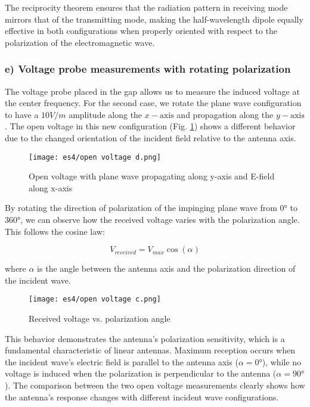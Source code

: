 \documentclass{article}
\begin{document}
The reciprocity theorem ensures that the radiation pattern in receiving mode mirrors that of the transmitting mode, making the half-wavelength dipole equally effective in both configurations when properly oriented with respect to the polarization of the electromagnetic wave.

\subsubsection{e) Voltage probe measurements with rotating polarization}
The voltage probe placed in the gap allows us to measure the induced voltage at the center frequency. For the second case, we rotate the plane wave configuration to have a $10 V/m$ amplitude along the $x-\text{axis}$ and propagation along the $y-\text{axis}$. The open voltage in this new configuration (Fig. \ref{fig:open_voltage_2}) shows a different behavior due to the changed orientation of the incident field relative to the antenna axis.

\begin{figure}[h]
\centering
\texttt{[image: es4/open voltage d.png]}
\caption{Open voltage with plane wave propagating along y-axis and E-field along x-axis}
\label{fig:open_voltage_2}
\end{figure}

By rotating the direction of polarization of the impinging plane wave from 0° to 360°, we can observe how the received voltage varies with the polarization angle. This follows the cosine law:

$$ V_{received} = V_{max} \cos(\alpha) $$

where $\alpha$ is the angle between the antenna axis and the polarization direction of the incident wave.

\begin{figure}[h]
\centering
\texttt{[image: es4/open voltage c.png]}
\caption{Received voltage vs. polarization angle}
\label{fig:voltage_vs_angle}
\end{figure}

This behavior demonstrates the antenna's polarization sensitivity, which is a fundamental characteristic of linear antennas. Maximum reception occurs when the incident wave's electric field is parallel to the antenna axis ($\alpha = 0°$), while no voltage is induced when the polarization is perpendicular to the antenna ($\alpha = 90°$). The comparison between the two open voltage measurements clearly shows how the antenna's response changes with different incident wave configurations.
\end{document}
